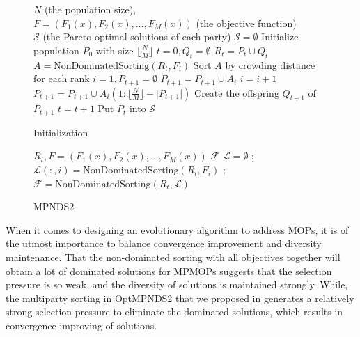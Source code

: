 \documentclass[preprint,12pt]{elsarticle}
\begin{document}
\begin{figure}[!t]
	\begin{algorithm}[H]
		\caption{Initialization}
		\label{alg:Initial}
		\begin{algorithmic}[1]
			\REQUIRE $N$ (the population size), \\
			$F=(F_1(x),F_2(x),\dots,F_M(x))$ (the objective function) \\
			\ENSURE $\mathcal{S}$ (the Pareto optimal solutions of each party)
			\STATE $\mathcal{S} = \emptyset$
			 \label{step:Initialloop1s}
			\STATE Initialize population $P_0$ with size $\lfloor \frac{N}{M} \rfloor$
			\STATE $t = 0,Q_t = \emptyset$
			\STATE $R_t = P_t \cup Q_t$
			\STATE $A = \text{NonDominatedSorting}(R_t, F_i)$
			\STATE Sort $A$ by crowding distance for each rank
			\STATE $i = 1, P_{t+1} = \emptyset$
			\STATE $P_{t+1} = P_{t+1} \cup A_i$
			\STATE $i = i+1$
			\ENDWHILE
			\STATE $P_{t+1} = P_{t+1} \cup A_i(1:\lfloor \frac{N}{M} \rfloor - \lvert P_{t+1} \rvert)$
			\STATE Create the offspring $Q_{t+1}$ of $P_{t+1}$
			\STATE $t = t+1$
			\ENDWHILE 
			\STATE Put $P_t$ into $\mathcal{S} $
			\ENDFOR \label{step:Initialloop1e}
		\end{algorithmic}
	\end{algorithm}
\end{figure}
% 
\begin{figure}
	\begin{algorithm}[H]
		\caption{MPNDS2 \cite{she2021new}}
		\label{alg:MPNDS2}
		\begin{algorithmic}[1]
			\REQUIRE $R_t, F=(F_1(x),F_2(x),\dots,F_M(x))$
			\ENSURE $\mathcal{F}$
			\STATE $\mathcal{L} = \emptyset$ ;
			\STATE $\mathcal{L}(:,i) = \text{NonDominatedSorting}(R_t,F_i)$ ;
			\ENDFOR
			\STATE $\mathcal{F} = \text{NonDominatedSorting}(R_t, \mathcal{L})$
		\end{algorithmic}
	\end{algorithm}
\end{figure}

When it comes to designing an evolutionary algorithm to address MOPs, it is of the utmost importance to balance convergence improvement and diversity maintenance.
That the non-dominated sorting with all objectives together will obtain a lot of dominated solutions for MPMOPs suggests that the selection pressure is so weak, and the diversity of solutions is maintained strongly.
While, the multiparty sorting in OptMPNDS2 that we proposed in \cite{she2021new} generates a relatively strong selection pressure to eliminate the dominated solutions, which results in convergence improving of solutions.
\end{document}
